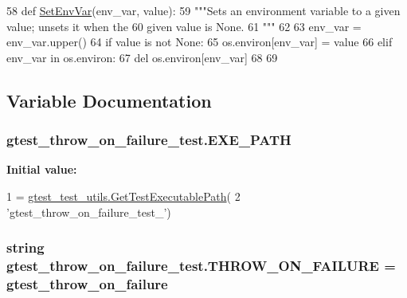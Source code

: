 \begin{DoxyCode}
58 \textcolor{keyword}{def }\hyperlink{namespacegtest__throw__on__failure__test_a79d85cfffbf8e8381ba32483ddc305c0}{SetEnvVar}(env\_var, value):
59   \textcolor{stringliteral}{"""Sets an environment variable to a given value; unsets it when the}
60 \textcolor{stringliteral}{  given value is None.}
61 \textcolor{stringliteral}{  """}
62 
63   env\_var = env\_var.upper()
64   \textcolor{keywordflow}{if} value \textcolor{keywordflow}{is} \textcolor{keywordflow}{not} \textcolor{keywordtype}{None}:
65     os.environ[env\_var] = value
66   \textcolor{keywordflow}{elif} env\_var \textcolor{keywordflow}{in} os.environ:
67     del os.environ[env\_var]
68 
69 
\end{DoxyCode}


\subsection{Variable Documentation}
\subsubsection[{\texorpdfstring{E\+X\+E\+\_\+\+P\+A\+TH}{EXE_PATH}}]{\setlength{\rightskip}{0pt plus 5cm}gtest\+\_\+throw\+\_\+on\+\_\+failure\+\_\+test.\+E\+X\+E\+\_\+\+P\+A\+TH}\hypertarget{namespacegtest__throw__on__failure__test_ac38dda23e362ecc76943073d173294f1}{}\label{namespacegtest__throw__on__failure__test_ac38dda23e362ecc76943073d173294f1}
{\bfseries Initial value\+:}
\begin{DoxyCode}
1 = \hyperlink{namespacegtest__test__utils_a89ed3717984a80ffbb7a9c92f71b86a2}{gtest\_test\_utils.GetTestExecutablePath}(
2     \textcolor{stringliteral}{'gtest\_throw\_on\_failure\_test\_'})
\end{DoxyCode}
\subsubsection[{\texorpdfstring{T\+H\+R\+O\+W\+\_\+\+O\+N\+\_\+\+F\+A\+I\+L\+U\+RE}{THROW_ON_FAILURE}}]{\setlength{\rightskip}{0pt plus 5cm}string gtest\+\_\+throw\+\_\+on\+\_\+failure\+\_\+test.\+T\+H\+R\+O\+W\+\_\+\+O\+N\+\_\+\+F\+A\+I\+L\+U\+RE = \textquotesingle{}gtest\+\_\+throw\+\_\+on\+\_\+failure\textquotesingle{}}\hypertarget{namespacegtest__throw__on__failure__test_af837d05b7ed8498aed8202c1d83d1e7a}{}\label{namespacegtest__throw__on__failure__test_af837d05b7ed8498aed8202c1d83d1e7a}
